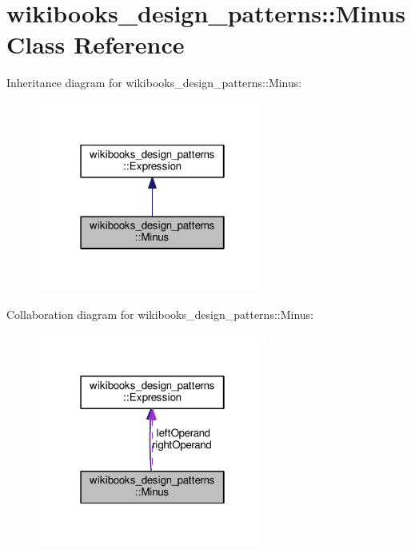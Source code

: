 \hypertarget{classwikibooks__design__patterns_1_1Minus}{}\section{wikibooks\+\_\+design\+\_\+patterns\+:\+:Minus Class Reference}
\label{classwikibooks__design__patterns_1_1Minus}


Inheritance diagram for wikibooks\+\_\+design\+\_\+patterns\+:\+:Minus\+:
\nopagebreak
\begin{figure}[H]
\begin{center}
\leavevmode
\includegraphics[width=214pt]{classwikibooks__design__patterns_1_1Minus__inherit__graph}
\end{center}
\end{figure}


Collaboration diagram for wikibooks\+\_\+design\+\_\+patterns\+:\+:Minus\+:
\nopagebreak
\begin{figure}[H]
\begin{center}
\leavevmode
\includegraphics[width=214pt]{classwikibooks__design__patterns_1_1Minus__coll__graph}
\end{center}
\end{figure}
